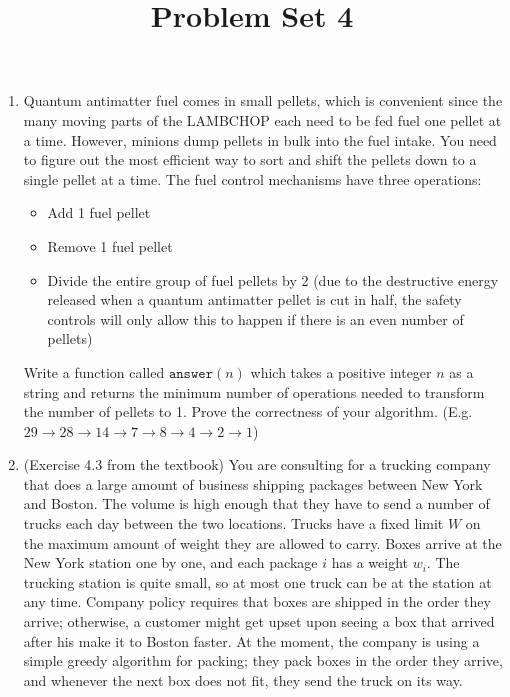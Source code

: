 \documentclass[11pt,a4paper]{article}
\title{Problem Set 4}
\author{}
\date{}
\theoremstyle{plain}
\begin{document}
\maketitle

\begin{enumerate}[leftmargin=*]

\item Quantum antimatter fuel comes in small pellets, which is convenient since the many moving parts of the LAMBCHOP each need to be fed fuel one pellet at a time. However, minions dump pellets in bulk into the fuel intake. You need to figure out the most efficient way to sort and shift the pellets down to a single pellet at a time. The fuel control mechanisms have three operations:
\begin{itemize}
    \item Add 1 fuel pellet
    \item Remove 1 fuel pellet
    \item Divide the entire group of fuel pellets by 2 (due to the destructive energy released when a quantum antimatter pellet is cut in half, the safety controls will only allow this to happen if there is an even number of pellets)
\end{itemize}

Write a function called $\texttt{answer}(n)$ which takes a positive integer $n$ as a string and returns the minimum number of operations needed to transform the number of pellets to 1. Prove the correctness of your algorithm. (E.g. $29 \to 28 \to 14 \to 7 \to 8 \to 4 \to 2 \to 1$)

\item (Exercise 4.3 from the textbook) You are consulting for a trucking company that does a large amount of business shipping packages between New York and Boston. The volume is high enough that they have to send a number of trucks each day between the two locations. Trucks have a fixed limit $W$ on the maximum amount of weight they are allowed to carry. Boxes arrive at the New York station one by one, and each package $i$ has a weight $w_i$. The trucking station is quite small, so at most one truck can be at the station at any time. Company policy requires that boxes are shipped in the order they arrive; otherwise, a customer might get upset upon seeing a box that arrived after his make it to Boston faster. At the moment, the company is using a simple greedy algorithm for packing; they pack boxes in the order they arrive, and whenever the next box does not fit, they send the truck on its way.


\end{enumerate}
\end{document}
